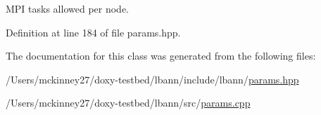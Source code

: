 M\+PI tasks allowed per node. 



Definition at line 184 of file params.\+hpp.



The documentation for this class was generated from the following files\+:\begin{DoxyCompactItemize}
\item 
/\+Users/mckinney27/doxy-\/testbed/lbann/include/lbann/\hyperlink{params_8hpp}{params.\+hpp}\item 
/\+Users/mckinney27/doxy-\/testbed/lbann/src/\hyperlink{params_8cpp}{params.\+cpp}\end{DoxyCompactItemize}
